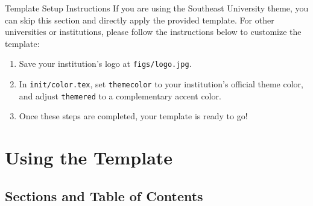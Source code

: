 \documentclass[8pt]{beamer}
\begin{document}
\begin{frame}{\insertsection}{\insertsubsection}
    \begin{block}{Template Setup Instructions}
        If you are using the Southeast University theme, you can skip this section and directly apply the provided template. For other universities or institutions, please follow the instructions below to customize the template:
        \begin{enumerate}
            \item Save your institution’s logo at \lstinline|figs/logo.jpg|.
            \item In \lstinline|init/color.tex|, set \lstinline|themecolor| to your institution’s official theme color, and adjust \lstinline|themered| to a complementary accent color.
            \item Once these steps are completed, your template is ready to go!
        \end{enumerate}
    \end{block}
\end{frame}

\section{Using the Template}

\makesection

\subsection{Sections and Table of Contents}
\end{document}
